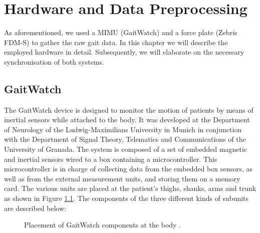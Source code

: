 \chapter{Hardware and Data Preprocessing}
\label{ch:Hardware}

As aforementioned, we used a MIMU (GaitWatch) and a force plate (Zebris FDM-S) to gather the raw gait data. In this chapter we will describe the employed hardware in detail. Subsequently, we will elaborate on the necessary synchronisation of both systems.

\section{GaitWatch}

The GaitWatch device \cite{olivares_vicente_gaitwatch_2013} is designed to monitor the motion of patients by means of inertial sensors while attached to the body. It was developed at the Department of Neurology of the Ludwig-Maximilians University in Munich in conjunction with the Department of Signal Theory, Telematics and Communications of the University of Granada. The system is composed of a set of embedded magnetic and inertial sensors wired to a box containing a microcontroller. This microcontroller is in charge of collecting data from the embedded box sensors, as well as from the external measurement units, and storing them on a memory card. The various units are placed at the patient's thighs, shanks, arms and trunk as shown in Figure \ref{fig:GaitWatch_placement}. The components of the three different kinds of subunits are described below:

\begin{figure}
	\centering
	\caption{Placement of GaitWatch components at the body \cite{olivares_vicente_gaitwatch_2013}.}
	\label{fig:GaitWatch_placement}
\end{figure}

